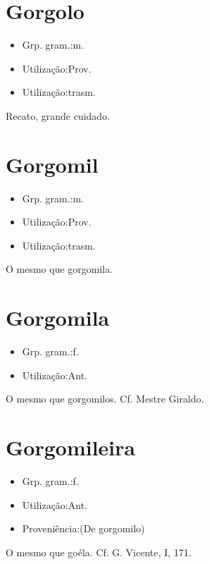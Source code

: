 \section{Gorgolo}
\begin{itemize}
\item {Grp. gram.:m.}
\end{itemize}
\begin{itemize}
\item {Utilização:Prov.}
\end{itemize}
\begin{itemize}
\item {Utilização:trasm.}
\end{itemize}
Recato, grande cuidado.
\section{Gorgomil}
\begin{itemize}
\item {Grp. gram.:m.}
\end{itemize}
\begin{itemize}
\item {Utilização:Prov.}
\end{itemize}
\begin{itemize}
\item {Utilização:trasm.}
\end{itemize}
O mesmo que \textunderscore gorgomila\textunderscore .
\section{Gorgomila}
\begin{itemize}
\item {Grp. gram.:f.}
\end{itemize}
\begin{itemize}
\item {Utilização:Ant.}
\end{itemize}
O mesmo que \textunderscore gorgomilos\textunderscore . Cf. \textunderscore Mestre Giraldo\textunderscore .
\section{Gorgomileira}
\begin{itemize}
\item {Grp. gram.:f.}
\end{itemize}
\begin{itemize}
\item {Utilização:Ant.}
\end{itemize}
\begin{itemize}
\item {Proveniência:(De \textunderscore gorgomilo\textunderscore )}
\end{itemize}
O mesmo que \textunderscore goéla\textunderscore . Cf. G. Vicente, I, 171.
